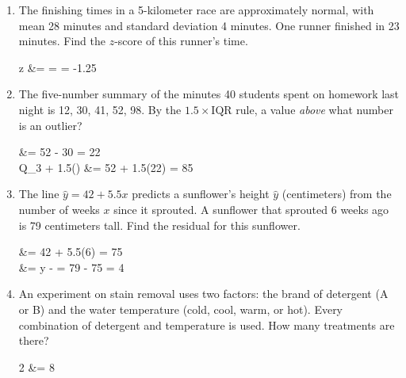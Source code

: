 \documentclass[12pt]{article}
\begin{document}
\begin{enumerate}[leftmargin=1.9em, itemsep=0.16in, resume]

  \boxguard[11]
  \item The finishing times in a 5-kilometer race are approximately normal, with mean 28
        minutes and standard deviation 4 minutes. One runner finished in 23 minutes. Find the
        $z$-score of this runner's time.
        \begin{work}
          z &=  =  = -1.25
        \end{work}
        \vspace{0.62in}

  \boxguard[11]
  \item The five-number summary of the minutes 40 students spent on homework last night is
        12, 30, 41, 52, 98. By the $1.5 \times \text{IQR}$ rule, a value \emph{above} what
        number is an outlier?
        \begin{work}
           &= 52 - 30 = 22 \\
          Q_3 + 1.5() &= 52 + 1.5(22) = 85
        \end{work}
        \vspace{0.50in}

  \boxguard[11]
  \item The line $\hat{y} = 42 + 5.5x$ predicts a sunflower's height $\hat{y}$ (centimeters)
        from the number of weeks $x$ since it sprouted. A sunflower that sprouted 6 weeks ago
        is 79 centimeters tall. Find the residual for this sunflower.
        \begin{work}
           &= 42 + 5.5(6) = 75 \\
           &= y -  = 79 - 75 = 4
        \end{work}
        \vspace{0.50in}

  \boxguard[10]
  \item An experiment on stain removal uses two factors: the brand of detergent (A or B) and
        the water temperature (cold, cool, warm, or hot). Every combination of detergent and
        temperature is used. How many treatments are there?
        \begin{work}
          2    &= 8 
        \end{work}
        \vspace{0.60in}


\end{enumerate}
\end{document}
